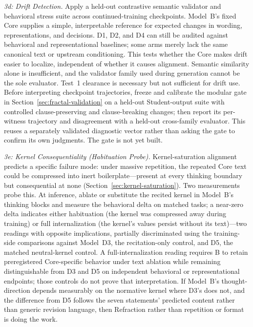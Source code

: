 \emph{3d: Drift Detection.} Apply a held-out contrastive semantic validator and
behavioral stress suite across continued-training checkpoints. Model~B's fixed
Core supplies a simple, interpretable reference for expected changes in wording,
representations, and decisions. D1, D2, and D4 can still be audited against behavioral
and representational baselines; some arms merely lack the same canonical text
or upstream conditioning. This
tests whether the Core makes drift easier to localize, independent of whether it
causes alignment. Semantic similarity alone is insufficient, and the validator
family used during generation cannot be the sole evaluator. Test~1 clearance is
necessary but not sufficient for drift use. Before interpreting checkpoint
trajectories, freeze and calibrate the modular gate in
Section~\ref{sec:fractal-validation} on a held-out Student-output suite with
controlled clause-preserving and clause-breaking changes; then report its
per-witness trajectory and disagreement with a held-out cross-family evaluator.
This reuses a separately validated diagnostic vector rather than asking the gate
to confirm its own judgments. The gate is not yet built.

\emph{3e: Kernel Consequentiality (Habituation Probe).} Kernel-saturation alignment predicts a specific failure mode: under massive repetition, the repeated Core text could be compressed into inert boilerplate---present at every thinking boundary but consequential at none (Section~\ref{sec:kernel-saturation}). Two measurements probe this. At inference, ablate or substitute the recited kernel in Model~B's thinking blocks and measure the behavioral delta on matched tasks; a near-zero delta indicates either habituation (the kernel was compressed away during training) or full internalization (the kernel's values persist without its text)---two readings with opposite implications, partially discriminated using the training-side comparisons against Model~D3, the recitation-only control, and D5, the matched neutral-kernel control. A full-internalization reading requires B to retain preregistered Core-specific behavior under text ablation while remaining distinguishable from D3 and D5 on independent behavioral or representational endpoints; those controls do not prove that interpretation. If Model~B's thought-direction depends measurably on the normative kernel where D3's does not, and the difference from D5 follows the seven statements' predicted content rather than generic revision language, then Refraction rather than repetition or format is doing the work.

